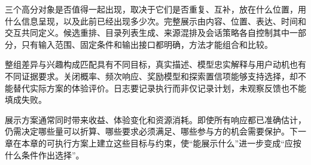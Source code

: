 三个高分对象是否值得一起出现，取决于它们是否重复、互补，放在什么位置，用什么信息呈现，以及此前已经出现多少次。完整展示由内容、位置、表达、时间和交互共同定义。候选重排、目录列表生成、来源混排及会话策略各自控制其中一部分，只有输入范围、固定条件和输出接口都明确，方法才能组合和比较。

整组差异与兴趣构成匹配具有不同目标，真实描述、模型忠实解释与用户动机也有不同证据要求。关闭概率、频次响应、奖励模型和探索置信项能够支持选择，却不能替代实际方案的体验评价。日志要记录执行而非仅记录计划，未观察反馈也不能填成失败。

展示方案通常同时带来收益、体验变化和资源消耗。即使所有响应都已准确估计，仍需决定哪些量可以折算、哪些要求必须满足、哪些参与方的机会需要保护。下一章在本章的可执行方案上建立这些目标与约束，使“能展示什么”进一步变成“应按什么条件作出选择”。
